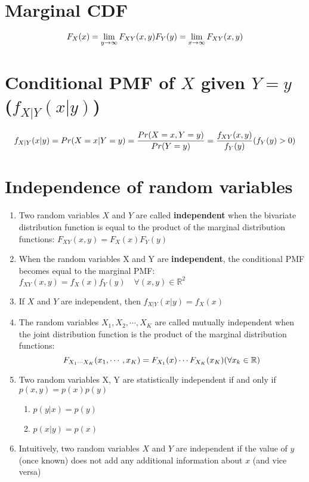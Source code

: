 \section{Marginal CDF \cite{ism-1}}\label{Multivariate Distributions: Marginal CDF}
\[
    \hfill
    F_X(x) = \lim_{y\to\infty} F_{XY}(x, y)
    \hfill
    F_Y(y) = \lim_{x\to\infty} F_{XY}(x, y)
    \hfill
\]


\section{Conditional PMF of $X$ given $Y = y$ ($f_{X|Y}(x|y)$) \cite{ism-1}}\label{Multivariate Distributions: conditional PMF}

\[
    f_{X|Y}(x|y) = Pr(X=x|Y=y)
    =\dfrac{Pr(X=x, Y=y)}{Pr(Y=y)} 
    = \dfrac{f_{XY}(x,y)}{f_Y(y)}
    \hfill
    (f_Y(y) > 0)
\]

\section{Independence of random variables \cite{ism-1}} \label{Multivariate Distributions: Independence of random variables}

\begin{enumerate}
    \item Two random variables $X$ and $Y$ are called \textbf{independent} when the bivariate distribution function is equal to the product of the marginal distribution functions: $F_{XY}(x, y) = F_X(x)F_Y(y)$

    \item When the random variables X and Y are \textbf{independent}, the conditional PMF becomes equal to the marginal PMF: $f_{XY}(x, y) = f_X(x)f_Y(y) \quad\forall (x,y) \in \mathbb{R}^2$

    \item If $X$ and $Y$ are independent, then $f_{X|Y}(x|y) = f_X(x)$

    \item The random variables $X_1, X_2,\cdots, X_K$ are called mutually independent when the joint distribution function is the product of the marginal distribution functions:
    \[
        F_{X_1\cdots X_K}(x_1,\cdots, x_K) = F_{X_1}(x)\cdots F_{X_K}(x_K)
        \hfill
        (\forall x_k \in \mathbb{R})
    \]

    \item Two random variables X, Y are statistically independent if and only if $p(x,y) = p(x)p(y)$ \cite{mfml-1}
    \begin{enumerate}
        \item $ p(y | x) = p(y)$
        \item $ p(x | y) = p(x)$
    \end{enumerate}

    \item Intuitively, two random variables $X$ and $Y$ are independent if the value of $y$ (once known) does not add any additional information about $x$ (and vice versa) \cite{mfml-1}
\end{enumerate}

